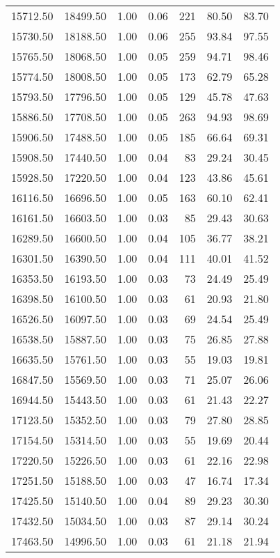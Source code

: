 \begin{table}
\begin{tabular}{rrrrrrr}
15712.50 & 18499.50 & 1.00 & 0.06 & 221 & 80.50 & 83.70 \\
15730.50 & 18188.50 & 1.00 & 0.06 & 255 & 93.84 & 97.55 \\
15765.50 & 18068.50 & 1.00 & 0.05 & 259 & 94.71 & 98.46 \\
15774.50 & 18008.50 & 1.00 & 0.05 & 173 & 62.79 & 65.28 \\
15793.50 & 17796.50 & 1.00 & 0.05 & 129 & 45.78 & 47.63 \\
15886.50 & 17708.50 & 1.00 & 0.05 & 263 & 94.93 & 98.69 \\
15906.50 & 17488.50 & 1.00 & 0.05 & 185 & 66.64 & 69.31 \\
15908.50 & 17440.50 & 1.00 & 0.04 & 83 & 29.24 & 30.45 \\
15928.50 & 17220.50 & 1.00 & 0.04 & 123 & 43.86 & 45.61 \\
16116.50 & 16696.50 & 1.00 & 0.05 & 163 & 60.10 & 62.41 \\
16161.50 & 16603.50 & 1.00 & 0.03 & 85 & 29.43 & 30.63 \\
16289.50 & 16600.50 & 1.00 & 0.04 & 105 & 36.77 & 38.21 \\
16301.50 & 16390.50 & 1.00 & 0.04 & 111 & 40.01 & 41.52 \\
16353.50 & 16193.50 & 1.00 & 0.03 & 73 & 24.49 & 25.49 \\
16398.50 & 16100.50 & 1.00 & 0.03 & 61 & 20.93 & 21.80 \\
16526.50 & 16097.50 & 1.00 & 0.03 & 69 & 24.54 & 25.49 \\
16538.50 & 15887.50 & 1.00 & 0.03 & 75 & 26.85 & 27.88 \\
16635.50 & 15761.50 & 1.00 & 0.03 & 55 & 19.03 & 19.81 \\
16847.50 & 15569.50 & 1.00 & 0.03 & 71 & 25.07 & 26.06 \\
16944.50 & 15443.50 & 1.00 & 0.03 & 61 & 21.43 & 22.27 \\
17123.50 & 15352.50 & 1.00 & 0.03 & 79 & 27.80 & 28.85 \\
17154.50 & 15314.50 & 1.00 & 0.03 & 55 & 19.69 & 20.44 \\
17220.50 & 15226.50 & 1.00 & 0.03 & 61 & 22.16 & 22.98 \\
17251.50 & 15188.50 & 1.00 & 0.03 & 47 & 16.74 & 17.34 \\
17425.50 & 15140.50 & 1.00 & 0.04 & 89 & 29.23 & 30.30 \\
17432.50 & 15034.50 & 1.00 & 0.03 & 87 & 29.14 & 30.24 \\
17463.50 & 14996.50 & 1.00 & 0.03 & 61 & 21.18 & 21.94 \\

\end{tabular}
\end{table}
